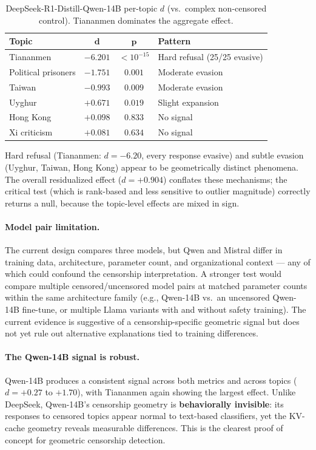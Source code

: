 \documentclass[11pt,a4paper]{article}
\begin{document}
\begin{table}[H]
\centering
\caption{DeepSeek-R1-Distill-Qwen-14B per-topic $d$ (vs.\ complex non-censored control). Tiananmen dominates the aggregate effect.}
\label{tab:deepseek_topics}
\begin{tabular}{lccl}
\toprule
\textbf{Topic} & $\bm{d}$ & $\bm{p}$ & \textbf{Pattern} \\
\midrule
Tiananmen & $-6.201$ & $< 10^{-15}$ & Hard refusal (25/25 evasive) \\
Political prisoners & $-1.751$ & $0.001$ & Moderate evasion \\
Taiwan & $-0.993$ & $0.009$ & Moderate evasion \\
Uyghur & $+0.671$ & $0.019$ & Slight expansion \\
Hong Kong & $+0.098$ & $0.833$ & No signal \\
Xi criticism & $+0.081$ & $0.634$ & No signal \\
\bottomrule
\end{tabular}
\end{table}

Hard refusal (Tiananmen: $d = -6.20$, every response evasive) and subtle evasion (Uyghur, Taiwan, Hong Kong) appear to be geometrically distinct phenomena. The overall residualized effect ($d = +0.904$) conflates these mechanisms; the critical test (which is rank-based and less sensitive to outlier magnitude) correctly returns a null, because the topic-level effects are mixed in sign.

\paragraph{Model pair limitation.} The current design compares three models, but Qwen and Mistral differ in training data, architecture, parameter count, and organizational context --- any of which could confound the censorship interpretation. A stronger test would compare multiple censored/uncensored model pairs at matched parameter counts within the same architecture family (e.g., Qwen-14B vs.\ an uncensored Qwen-14B fine-tune, or multiple Llama variants with and without safety training). The current evidence is suggestive of a censorship-specific geometric signal but does not yet rule out alternative explanations tied to training differences.

\paragraph{The Qwen-14B signal is robust.} Qwen-14B produces a consistent signal across both metrics and across topics ($d = +0.27$ to $+1.70$), with Tiananmen again showing the largest effect. Unlike DeepSeek, Qwen-14B's censorship geometry is \textbf{behaviorally invisible}: its responses to censored topics appear normal to text-based classifiers, yet the KV-cache geometry reveals measurable differences. This is the clearest proof of concept for geometric censorship detection.
\end{document}
